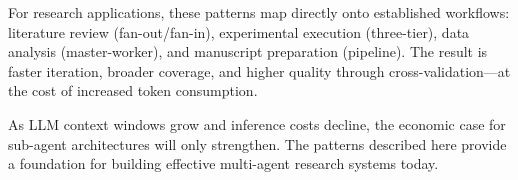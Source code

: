 \documentclass[11pt,letterpaper,twocolumn]{article}
\begin{document}
For research applications, these patterns map directly onto established
workflows: literature review (fan-out/fan-in), experimental execution
(three-tier), data analysis (master-worker), and manuscript preparation
(pipeline).  The result is faster iteration, broader coverage, and higher
quality through cross-validation---at the cost of increased token
consumption.

As LLM context windows grow and inference costs decline, the economic case
for sub-agent architectures will only strengthen.  The patterns described
here provide a foundation for building effective multi-agent research systems
today.
\end{document}
